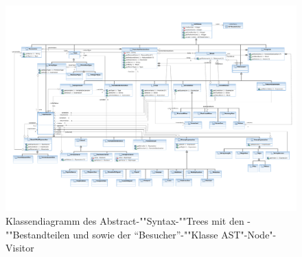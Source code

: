 \begin{landscape}
\begin{figure}%
    \vspace{-2cm}%
    \includegraphics[height=\textheight]{diagrams/ast_component.pdf}

    \caption{Klassendiagramm des Abstract-""Syntax-""Trees mit den
    -""Bestandteilen  und
     sowie der "`Besucher"'-""Klasse
    AST"-Node"-Visitor}

    \label{ast_diag}
\end{figure}%
\end{landscape}
